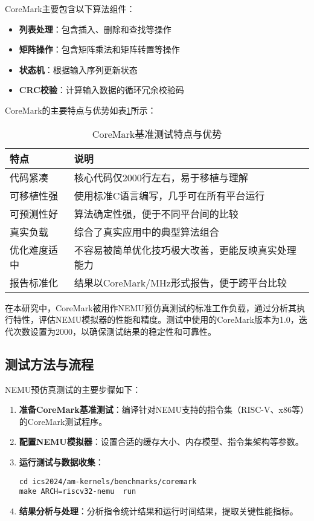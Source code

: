 \documentclass[bachelor]{thesis-uestc}
\begin{document}
CoreMark主要包含以下算法组件：

\begin{itemize}
    \item \textbf{列表处理}：包含插入、删除和查找等操作
    \item \textbf{矩阵操作}：包含矩阵乘法和矩阵转置等操作
    \item \textbf{状态机}：根据输入序列更新状态
    \item \textbf{CRC校验}：计算输入数据的循环冗余校验码
\end{itemize}

CoreMark的主要特点与优势如表\ref{tab:coremark_features}所示：

\begin{table}[htbp]
\caption{CoreMark基准测试特点与优势}
\centering
\begin{tabular}{|p{3cm}|p{10cm}|}
\hline
\textbf{特点} & \textbf{说明} \\
\hline
代码紧凑 & 核心代码仅2000行左右，易于移植与理解 \\
\hline
可移植性强 & 使用标准C语言编写，几乎可在所有平台运行 \\
\hline
可预测性好 & 算法确定性强，便于不同平台间的比较 \\
\hline
真实负载 & 综合了真实应用中的典型算法组合 \\
\hline
优化难度适中 & 不容易被简单优化技巧极大改善，更能反映真实处理能力 \\
\hline
报告标准化 & 结果以CoreMark/MHz形式报告，便于跨平台比较 \\
\hline
\end{tabular}
\label{tab:coremark_features}
\end{table}

在本研究中，CoreMark被用作NEMU预仿真测试的标准工作负载，通过分析其执行特性，评估NEMU模拟器的性能和精度。测试中使用的CoreMark版本为1.0，迭代次数设置为2000，以确保测试结果的稳定性和可靠性。

\subsection{测试方法与流程}

NEMU预仿真测试的主要步骤如下：

\begin{enumerate}
    \item \textbf{准备CoreMark基准测试}：编译针对NEMU支持的指令集（RISC-V、x86等）的CoreMark测试程序。
    
    \item \textbf{配置NEMU模拟器}：设置合适的缓存大小、内存模型、指令集架构等参数。
    
    \item \textbf{运行测试与数据收集}：
    \begin{verbatim}
cd ics2024/am-kernels/benchmarks/coremark
make ARCH=riscv32-nemu  run
    \end{verbatim}
    
    \item \textbf{结果分析与处理}：分析指令统计结果和运行时间结果，提取关键性能指标。
\end{enumerate}
\end{document}

